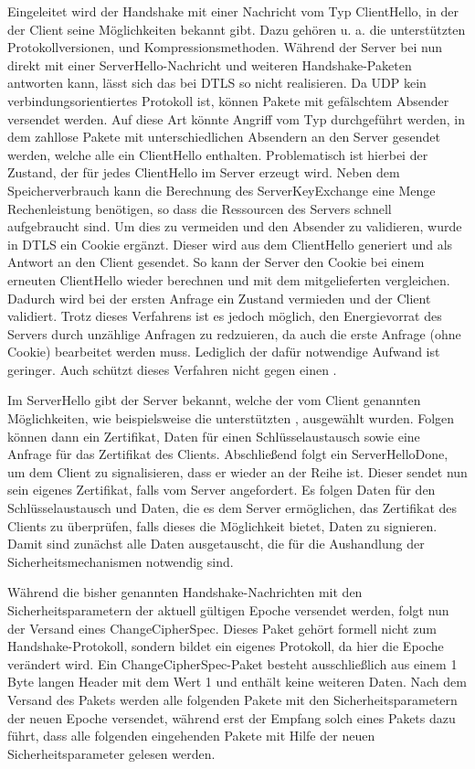 Eingeleitet wird der Handshake mit einer Nachricht vom Typ ClientHello, in der der Client seine Möglichkeiten bekannt gibt. Dazu gehören u. a. die unterstützten
Protokollversionen,  und Kompressionsmethoden. Während der Server bei  nun direkt mit einer ServerHello-Nachricht und weiteren
Handshake-Paketen antworten kann, lässt sich das bei DTLS so nicht realisieren. Da UDP kein verbindungsorientiertes Protokoll ist, können Pakete mit gefälschtem
Absender versendet werden. Auf diese Art könnte Angriff vom Typ  durchgeführt werden, in dem zahllose Pakete mit unterschiedlichen Absendern an den Server
gesendet werden, welche alle ein ClientHello enthalten. Problematisch ist hierbei der Zustand, der für jedes ClientHello im Server erzeugt wird. Neben dem
Speicherverbrauch kann die Berechnung des ServerKeyExchange eine Menge Rechenleistung benötigen, so dass die Ressourcen des Servers schnell aufgebraucht sind.
Um dies zu vermeiden und den Absender zu validieren, wurde in DTLS ein Cookie ergänzt. Dieser wird aus dem ClientHello generiert und als Antwort an den Client
gesendet. So kann der Server den Cookie bei einem erneuten ClientHello wieder berechnen und mit dem mitgelieferten vergleichen. Dadurch wird bei der ersten Anfrage
ein Zustand vermieden und der Client validiert. Trotz dieses Verfahrens ist es jedoch möglich, den Energievorrat des Servers durch unzählige Anfragen zu redzuieren,
da auch die erste Anfrage (ohne Cookie) bearbeitet werden muss. Lediglich der dafür notwendige Aufwand ist geringer. Auch schützt dieses Verfahren nicht gegen
einen .

Im ServerHello gibt der Server bekannt, welche der vom Client genannten Möglichkeiten, wie beispielsweise die unterstützten , ausgewählt wurden.
Folgen können dann ein Zertifikat, Daten für einen Schlüsselaustausch sowie eine Anfrage für das Zertifikat des Clients. Abschließend folgt ein ServerHelloDone, um
dem Client zu signalisieren, dass er wieder an der Reihe ist. Dieser sendet nun sein eigenes Zertifikat, falls vom Server angefordert. Es folgen Daten für den
Schlüsselaustausch und Daten, die es dem Server ermöglichen, das Zertifikat des Clients zu überprüfen, falls dieses die Möglichkeit bietet, Daten zu signieren.
Damit sind zunächst alle Daten ausgetauscht, die für die Aushandlung der Sicherheitsmechanismen notwendig sind.

Während die bisher genannten Handshake-Nachrichten mit den Sicherheitsparametern der aktuell gültigen Epoche versendet werden, folgt nun der Versand eines
ChangeCipherSpec. Dieses Paket gehört formell nicht zum Handshake-Protokoll, sondern bildet ein eigenes Protokoll, da hier die Epoche verändert wird.
Ein ChangeCipherSpec-Paket besteht ausschließlich aus einem 1 Byte langen Header mit dem Wert 1 und enthält keine weiteren Daten.
Nach dem Versand des Pakets werden alle folgenden Pakete mit den Sicherheitsparametern der neuen Epoche versendet, während erst der Empfang solch eines
Pakets dazu führt, dass alle folgenden eingehenden Pakete mit Hilfe der neuen Sicherheitsparameter gelesen werden.

